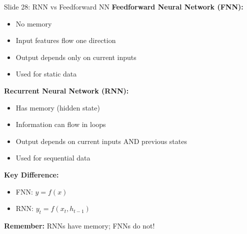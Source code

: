 \documentclass[8pt]{beamer}
\begin{document}
	\begin{frame}{Slide 28: RNN vs Feedforward NN}
		\fontsize{6.5}{7.5}\selectfont
		\textbf{Feedforward Neural Network (FNN):}
		\begin{itemize}
			\item No memory
			\item Input features flow one direction
			\item Output depends only on current inputs
			\item Used for static data
		\end{itemize}
		
		\vspace{0.1cm}
		\textbf{Recurrent Neural Network (RNN):}
		\begin{itemize}
			\item Has memory (hidden state)
			\item Information can flow in loops
			\item Output depends on current inputs AND previous states
			\item Used for sequential data
		\end{itemize}
		
		\vspace{0.1cm}
		\textbf{Key Difference:}
		\begin{itemize}
			\item FNN: $y = f(x)$
			\item RNN: $y_t = f(x_t, h_{t-1})$
		\end{itemize}
		
		\textcolor{myblue}{\textbf{Remember:}} RNNs have memory; FNNs do not!
	\end{frame}
	
\end{document}

